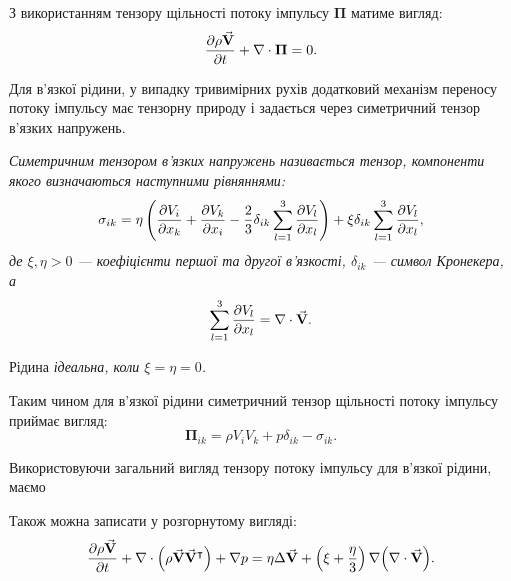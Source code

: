 \begin{law}
	З використанням тензору щільності потоку імпульсу $\bm{\Pi}$ матиме вигляд:
	\begin{equation}
		\frac{\partial \rho {\vec{\mathbf{V}}}}{\partial t} + \nabla \cdot \bm{\Pi} = 0.
	\end{equation}
\end{law}

Для в'язкої рідини, у випадку тривимірних рухів додатковий механізм переносу потоку імпульсу має тензорну природу і задається через симетричний тензор в'язких напружень.

\begin{definition}
	\it{Симетричним тензором в'язких напружень} називається тензор, компоненти якого визначаються наступними рівняннями: 
	\begin{equation}
		\sigma_{ik} = \eta \left( \frac{\partial V_i}{\partial x_k} + \frac{\partial V_k}{\partial x_i} - \frac{2}{3} \delta_{ik} \displaystyle\sum\limits_{l = 1}^3 \frac{\partial V_l}{\partial x_l}\right) + \xi \delta_{ik} \displaystyle\sum\limits_{l = 1}^3 \frac{\partial V_l}{\partial x_l},
	\end{equation}
	де $\xi, \eta > 0$ --- коефіцієнти першої та другої в'язкості, $\delta_{ik}$ --- символ Кронекера, а
	\begin{equation}
		\displaystyle\sum\limits_{l = 1}^3 \frac{\partial V_l}{\partial x_l} = \nabla \cdot {\vec{\mathbf{V}}}.
	\end{equation}
\end{definition}

\begin{remark}
	Рідина \it{ідеальна}, коли $\xi = \eta = 0$.
\end{remark}

Таким чином для в'язкої рідини симетричний тензор щільності потоку імпульсу приймає вигляд:
\begin{equation}
	\bm{\Pi}_{ik} = \rho V_i V_k + p \delta_{ik} - \sigma_{ik}.
\end{equation}

Використовуючи загальний вигляд тензору потоку імпульсу для в'язкої рідини, маємо
\begin{law}
	Також можна записати у розгорнутому вигляді:
	\begin{equation}
		\frac{\partial \rho {\vec{\mathbf{V}}}}{\partial t} + \nabla \cdot \Big(\rho {\vec{\mathbf{V}}} {\vec{\mathbf{V}}}^\intercal\Big) + \nabla p = \eta \Delta {\vec{\mathbf{V}}} + \left( \xi + \frac{\eta}{3} \right) \nabla \Big(\nabla \cdot {\vec{\mathbf{V}}} \Big).
	\end{equation}
\end{law}

